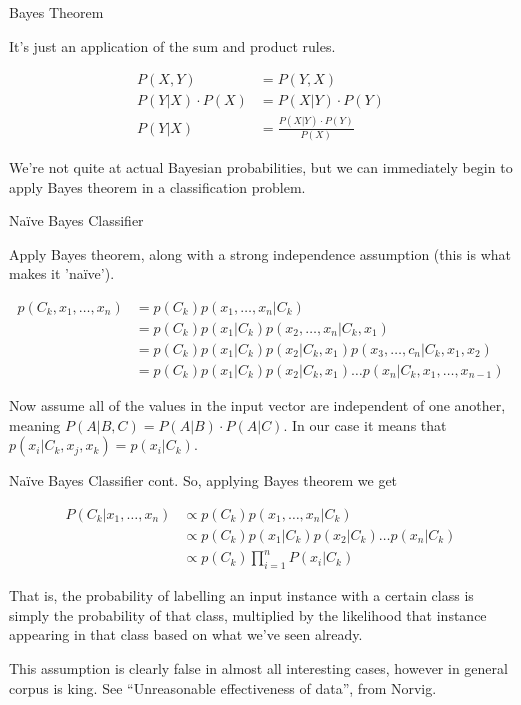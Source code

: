 \documentclass{beamer}
\begin{document}
\begin{frame}{Bayes Theorem}

  It's just an application of the sum and product rules.


  \begin{align}
    P(X, Y) &= P(Y, X) \nonumber \\
    P(Y|X) \cdot P(X) &= P(X|Y) \cdot P(Y) \nonumber \\
    P(Y|X) &= \frac{P(X|Y) \cdot P(Y)}{P(X)} \nonumber
  \end{align}

  We're not quite at actual Bayesian probabilities, but we can
  immediately begin to apply Bayes theorem in a classification problem.

\end{frame}

\begin{frame}{Na\"ive Bayes Classifier}

  Apply Bayes theorem, along with a strong independence assumption
  (this is what makes it 'na\"ive').

  \begin{align}
    p(C_k, x_1, \ldots, x_n) &= p(C_k)p(x_1, \ldots, x_n | C_k)
    \nonumber \\
    &= p(C_k)p(x_1|C_k)p(x_2, \ldots, x_n | C_k, x_1) \nonumber \\
    &= p(C_k)p(x_1|C_k)p(x_2|C_k, x_1)p(x_3,\ldots,c_n|C_k,x_1,x_2)
    \nonumber \\
    &= p(C_k)p(x_1|C_k)p(x_2|C_k,x_1)\ldots p(x_n|C_k,x_1,\ldots,
    x_{n-1}) \nonumber
  \end{align}

  Now assume all of the values in the input vector are independent of
  one another, meaning $P(A|B, C) = P(A|B) \cdot P(A|C)$. In our case
  it means that $p(x_i | C_k, x_j, x_k) = p(x_i | C_k)$.

\end{frame}

\begin{frame}{Na\"ive Bayes Classifier cont.}
  So, applying Bayes theorem we get

  \begin{align}
  P(C_k|x_1, \ldots, x_n) &\propto p(C_k) p(x_1,\ldots,x_n | C_k)
  \nonumber \\
  &\propto p(C_k) p(x_1 | C_k) p(x_2 | C_k) \ldots p(x_n | C_k)
  \nonumber \\
  &\propto p(C_k)\prod_{i=1}^{n}P(x_i | C_k) \nonumber
  \end{align}

  That is, the probability of labelling an input instance with a
  certain class is simply the probability of that class, multiplied by
  the likelihood that instance appearing in that class based on what
  we've seen already.


  {\tiny
    This assumption is clearly false in almost all interesting
    cases, however in general corpus is king. See ``Unreasonable
    effectiveness of data'', from Norvig.
  }

\end{frame}
\end{document}
